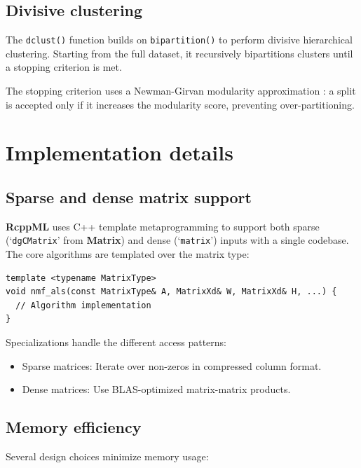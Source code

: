\documentclass[11pt]{article}
\newcommand{\proglang}[1]{\textsf{#1}}
\newcommand{\pkg}[1]{\textbf{#1}}
\newcommand{\code}[1]{\texttt{#1}}
\newcommand{\fct}[1]{\code{#1()}}
\newcommand{\class}[1]{`\code{#1}'}
\begin{document}
\subsection{Divisive clustering}

The \fct{dclust} function builds on \fct{bipartition} to perform divisive 
hierarchical clustering. Starting from the full dataset, it recursively 
bipartitions clusters until a stopping criterion is met.

The stopping criterion uses a Newman-Girvan modularity approximation 
\citep{Newman2004}: a split is accepted only if it increases the modularity 
score, preventing over-partitioning.


\section{Implementation details} \label{sec:implementation}

\subsection{Sparse and dense matrix support}

\pkg{RcppML} uses \proglang{C++} template metaprogramming to support both sparse 
(\class{dgCMatrix} from \pkg{Matrix}) and dense (\class{matrix}) inputs with a 
single codebase. The core algorithms are templated over the matrix type:

\begin{lstlisting}
template <typename MatrixType>
void nmf_als(const MatrixType& A, MatrixXd& W, MatrixXd& H, ...) {
  // Algorithm implementation
}
\end{lstlisting}

Specializations handle the different access patterns:
\begin{itemize}
  \item Sparse matrices: Iterate over non-zeros in compressed column format.
  \item Dense matrices: Use BLAS-optimized matrix-matrix products.
\end{itemize}

\subsection{Memory efficiency}

Several design choices minimize memory usage:
\end{document}
